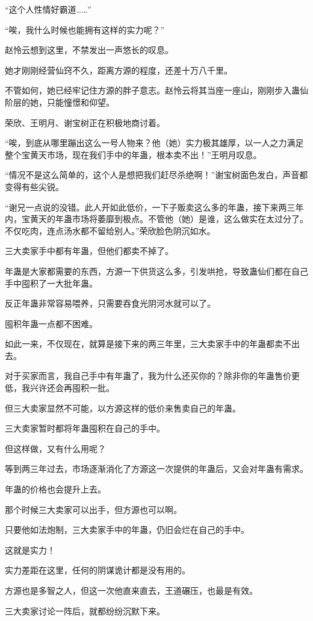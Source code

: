 \begin{this_body}
“这个人性情好霸道……”

“唉，我什么时候也能拥有这样的实力呢？”

赵怜云想到这里，不禁发出一声悠长的叹息。

她才刚刚经营仙窍不久，距离方源的程度，还差十万八千里。

不管如何，她已经牢记住方源的胖子意志。赵怜云将其当座一座山，刚刚步入蛊仙阶层的她，只能憧憬和仰望。

荣欣、王明月、谢宝树正在积极地商讨着。

“唉，到底从哪里蹦出这么一号人物来？他（她）实力极其雄厚，以一人之力满足整个宝黄天市场，现在我们手中的年蛊，根本卖不出！”王明月叹息。

“情况不是这么简单的，这个人是想把我们赶尽杀绝啊！”谢宝树面色发白，声音都变得有些尖锐。

“谢兄一点说的没错。此人开如此低价，一下子贩卖这么多的年蛊，接下来两三年内，宝黄天的年蛊市场将萎靡到极点。不管他（她）是谁，这么做实在太过分了。不仅吃肉，连点汤水都不留给别人。”荣欣脸色阴沉如水。

三大卖家手中都有年蛊，但他们都卖不掉了。

年蛊是大家都需要的东西，方源一下供货这么多，引发哄抢，导致蛊仙们都在自己手中囤积了一大批年蛊。

反正年蛊非常容易喂养，只需要吞食光阴河水就可以了。

囤积年蛊一点都不困难。

如此一来，不仅现在，就算是接下来的两三年里，三大卖家手中的年蛊都卖不出去。

对于买家而言，我自己手中有年蛊了，我为什么还买你的？除非你的年蛊售价更低，我兴许还会再囤积一批。

但三大卖家显然不可能，以方源这样的低价来售卖自己的年蛊。

三大卖家暂时都将年蛊囤积在自己的手中。

但这样做，又有什么用呢？

等到两三年过去，市场逐渐消化了方源这一次提供的年蛊后，又会对年蛊有需求。

年蛊的价格也会提升上去。

那个时候三大卖家可以出手，但方源也可以啊。

只要他如法炮制，三大卖家手中的年蛊，仍旧会烂在自己的手中。

这就是实力！

实力差距在这里，任何的阴谋诡计都是没有用的。

方源也是多智之人，但这一次他直来直去，王道碾压，也最是有效。

三大卖家讨论一阵后，就都纷纷沉默下来。


\end{this_body}
